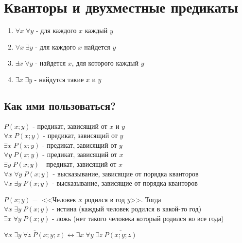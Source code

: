 \section{Кванторы и двухместные предикаты}

\begin{remark}
    \hfill

    \begin{enumerate}
        \item $\forall x \; \forall y$ - для каждого $x$ каждый $y$
        \item $\forall x \; \exists y$ - для каждого $x$ найдется $y$
        \item $\exists x \; \forall y$ - найдется $x$, для которого каждый $y$
        \item $\exists x \; \exists y$ - найдутся такие $x$ и $y$
    \end{enumerate}
\end{remark}

\subsection{Как ими пользоваться?}

$P(x; y)$ - предикат, зависящий от $x$ и $y$ \\
$\forall x \; P(x; y)$ - предикат, зависящий от $y$ \\
$\exists x \; P(x; y)$ - предикат, зависящий от $y$ \\
$\forall y \; P(x; y)$ - предикат, зависящий от $x$ \\
$\exists y \; P(x; y)$ - предикат, зависящий от $x$ \\

$\forall x \; \forall y \; P(x; y)$ - высказывание, зависящие от порядка кванторов \\
$\forall x \; \exists y \; P(x; y)$ - высказывание, зависящие от порядка кванторов \\

\begin{example}
    $P(x; y) = $ <<Человек $x$ родился в год $y$>>. Тогда \\
    $\forall x \; \exists y \; P(x; y)$ - истина (каждый человек родился в какой-то год) \\
    $\exists x \; \forall y \; P(x; y)$ - ложь (нет такого человека который родился во все года)
\end{example}

\begin{theorem}
    \hfill \break

    $\overline{\forall x \; \exists y \; \forall z \; P(x; y; z)} \leftrightarrow \exists x \; \forall y \; \exists z \; \overline{P(x; y; z)}$
\end{theorem}

